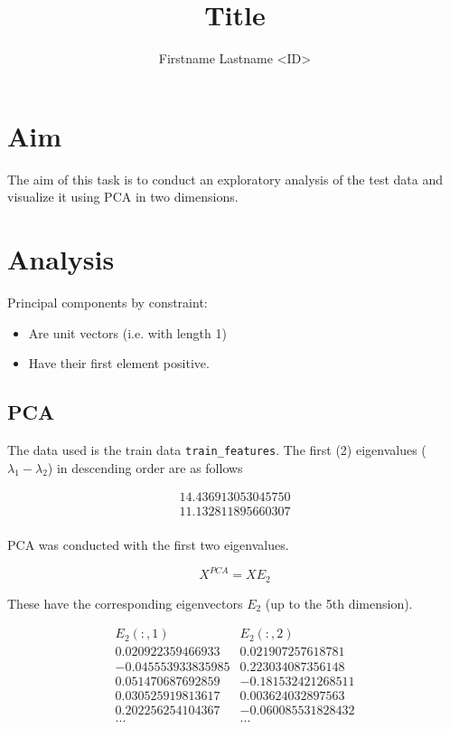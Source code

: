 \documentclass{article}
\title{Title}
\date{}
\author{Firstname Lastname \textless ID\textgreater}
\begin{document}
\begin{multicols}{2}
    [
        \maketitle
    ]

    \section{Aim}
    The aim of this task is to conduct an exploratory analysis of the test data
    and visualize it using PCA in two dimensions.
    
    \section{Analysis}
    Principal components by constraint:
    \begin{itemize}
        \item Are unit vectors (i.e. with length 1)
        \item Have their first element positive.
    \end{itemize}
    
    \subsection{PCA}
    The data used is the train data \texttt{train\_features}.
    The first (2) eigenvalues ($\lambda_1 - \lambda_{2}$) in descending order are as follows\:
    
    \begin{equation*}
    \begin{matrix}
        14.436913053045750 \\ 
        11.132811895660307 \\
    \end{matrix}
    \end{equation*}
    
    PCA was conducted with the first two eigenvalues.
    
    \begin{equation}
        X^{PCA} = X E_2
    \end{equation}
    
    These have the corresponding eigenvectors $E_2$
        (up to the 5th dimension).
    
    \begin{equation*}
    \begin{matrix}
        E_2(:,1) & E_2(:,2) \\
        0.020922359466933 &  0.021907257618781 \\
  -0.045553933835985 &  0.223034087356148 \\
   0.051470687692859 & -0.181532421268511 \\
   0.030525919813617 &  0.003624032897563 \\
   0.202256254104367 & -0.060085531828432 \\
        ... & ...
    \end{matrix}
    \end{equation*}
    

\end{multicols}
\end{document}

